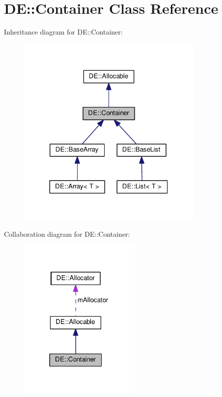 \hypertarget{classDE_1_1Container}{}\section{DE\+:\+:Container Class Reference}
\label{classDE_1_1Container}


Inheritance diagram for DE\+:\+:Container\+:\nopagebreak
\begin{figure}[H]
\begin{center}
\leavevmode
\includegraphics[width=260pt]{classDE_1_1Container__inherit__graph}
\end{center}
\end{figure}


Collaboration diagram for DE\+:\+:Container\+:\nopagebreak
\begin{figure}[H]
\begin{center}
\leavevmode
\includegraphics[width=170pt]{classDE_1_1Container__coll__graph}
\end{center}
\end{figure}
